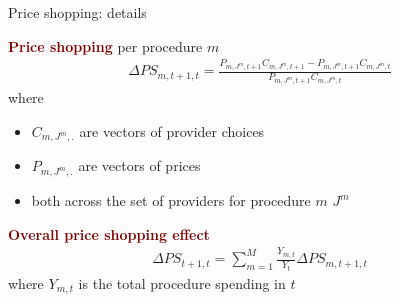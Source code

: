 \documentclass[12pt,notes=hide,aspectratio=169,mathserif]{beamer}
\newcommand\newbold[1]{\textcolor{maroon}{\textbf{#1}}}
\begin{document}
\begin{frame}{Price shopping: details}
  \hypertarget{BCHK:PS}{}

  \newbold{Price shopping} per procedure $m$
  \begin{align*}
      \Delta PS_{m,t+1,t} = \frac{P_{m,J^m,t+1} C_{m,J^m,t+1} - P_{m,J^m,t+1} C_{m,J^m,t}}{P_{m,J^m,t+1} C_{m,J^m,t}}
  \end{align*}
  where
  \begin{itemize}
      \item $C_{m,J^m,.}$ are vectors of provider choices 
      \item $P_{m,J^m,.}$ are vectors of prices 
      \item both across the set of providers for procedure $m$ $J^m$
  \end{itemize}
  \vspace{3mm}

  \newbold{Overall price shopping effect}
  \vspace{-2mm}
  \begin{align*}
      \Delta PS_{t+1,t} = \sum_{m=1}^{M} \frac{Y_{m,t}}{Y_t} \Delta PS_{m,t+1,t}
  \end{align*}   
  where $Y_{m,t}$ is the total procedure spending in $t$ 


  \vspace{-3mm}
  \hyperlink{BCHK:decomposition}{}
\end{frame}
%

%
\end{document}
